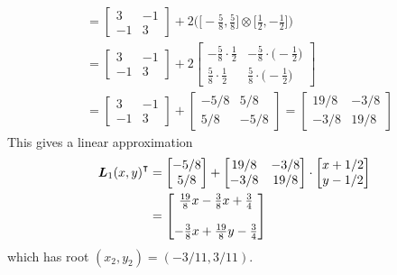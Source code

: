 \begin{example}
\begin{align*}
&= \begin{bmatrix} 3 & -1 \\ -1 & 3 \end{bmatrix} + 2 \big( \big[ -\tfrac{5}{8}, \tfrac{5}{8} \big] \otimes \big[ \tfrac{1}{2}, -\tfrac{1}{2} \big] \big) \\
&= \begin{bmatrix} 3 & -1 \\ -1 & 3 \end{bmatrix} + 2 \begin{bmatrix} -\tfrac{5}{8} \cdot \tfrac{1}{2} & -\tfrac{5}{8}\cdot \big( -\tfrac{1}{2} \big) \\ \tfrac{5}{8} \cdot \tfrac{1}{2} & \tfrac{5}{8} \cdot \big(- \tfrac{1}{2} \big) \end{bmatrix} \\
&= \begin{bmatrix} 3 & -1 \\ -1 & 3 \end{bmatrix} + \begin{bmatrix} -5/8 & 5/8 \\ 5/8 & -5/8 \end{bmatrix} = \begin{bmatrix} 19/8 & -3/8 \\ -3/8 & 19/8 \end{bmatrix}
\end{align*}
This gives a linear approximation 
\begin{align*}
{\boldsymbol{L}_1(x,y)}^\intercal &= \begin{bmatrix} -5/8 \\ 5/8 \end{bmatrix} + \begin{bmatrix} 19/8 & -3/8 \\ -3/8 & 19/8 \end{bmatrix} \cdot \begin{bmatrix} x + 1/2 \\ y - 1/2 \end{bmatrix} \\
&= \begin{bmatrix} \tfrac{19}{8}x-\tfrac{3}{8}x + \tfrac{3}{4} \\ \\ -\tfrac{3}{8}x+\tfrac{19}{8}y - \tfrac{3}{4} \end{bmatrix}
\end{align*}
which has root $(x_2, y_2) = (-3/11, 3/11)$.


\end{example}
